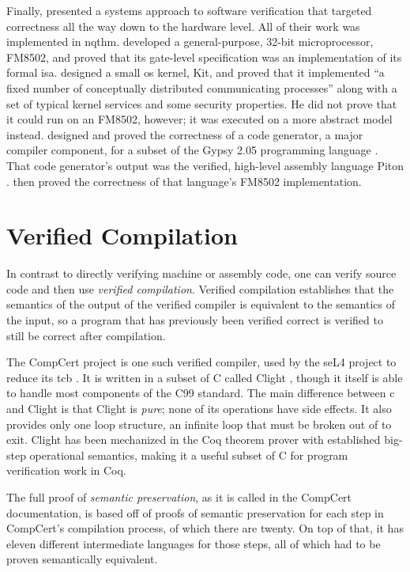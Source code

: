 Finally, \textcite{bevier1989approach} presented a systems approach
to software verification that targeted correctness
all the way down to the hardware level.
All of their work was implemented in \ac{nqthm}.
\Textcite{hunt1989microprocessor} developed a general-purpose, 32-bit microprocessor,
FM8502, and proved that its gate-level specification
was an implementation of its formal \ac{isa}.
\Textcite{bevier1989short,bevier1989kit,bevier1987verified}
designed a small \ac{os} kernel, Kit, and proved that it implemented
``a fixed number of conceptually distributed communicating processes''
along with a set of typical kernel services and some security properties.
He did not prove that it could run on an FM8502, however;
it was executed on a more abstract model instead.
\Textcite{young1989generator} designed and proved the correctness of a code generator,
a major compiler component, for a subset of the Gypsy 2.05 programming language
\autocite{good1986gypsy}. That code generator's output was
the verified, high-level assembly language Piton \autocite{moore1988piton}.
\Textcite{moore1989language} then proved the correctness
of that language's FM8502 implementation.

\section{Verified Compilation}\label{se:verified}
In contrast to directly verifying machine or assembly code,
one can verify source code and then use \emph{verified compilation}.%
Verified compilation establishes that
the semantics of the output of the verified compiler
is equivalent to the semantics of the input,
so a program that has previously been verified correct
is verified to still be correct after compilation.

The CompCert project is one such verified compiler,
used by the seL4 project to reduce its \ac{tcb} \autocite{Klein_AEMSKH_14}.
It is written in a subset of C
called Clight \autocite{leroy:compcert,blazy2009clight},
though it itself is able to handle most components of the C99 standard.
The main difference between \gls{c} and Clight is that Clight is \emph{pure};
none of its operations have side effects. It also provides only one loop structure,
an infinite loop that must be broken out of to exit.
Clight has been mechanized in the Coq theorem prover with established
big-step operational semantics, making it a useful subset of C
for program verification work in Coq.

The full proof of \emph{semantic preservation},
as it is called in the CompCert documentation,
is based off of proofs of semantic preservation
for each step in CompCert's compilation process, of which there are twenty.
On top of that, it has eleven different intermediate languages for those steps,
all of which had to be proven semantically equivalent.

